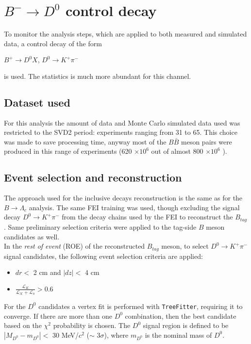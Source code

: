 
\section{$B^- \rightarrow D^0$ control decay}
\label{sec:chargedCorrBtoD0}

To monitor the analysis steps, which are applied to both measured and simulated data, a control decay of the form \\
\begin{center}
 $B^+ \rightarrow D^0 X$, $D^0 \rightarrow K^+ \pi^-$ 
\end{center}
is used. The statistics is much more abundant for this channel.

\subsection{Dataset used}

For this analysis the amount of data and Monte Carlo simulated data used was restricted to the SVD2 period: experiments ranging from 31 to 65. This choice was made to save processing time, anyway most of the $B\bar{B}$ meson pairs were produced in this range of experiments (620 $\times 10^6$ out of almost 800 $\times 10^6$ ).

\subsection{Event selection and reconstruction}

The approach used for the inclusive decays reconstruction is the same as for the $B \rightarrow \Lambda_c$ analysis. The same FEI training was used, though excluding the signal decay $D^0 \rightarrow K^+ \pi^-$ from the decay chains used by the FEI to reconstruct the $B_{tag}$.
Same preliminary selection criteria were applied to the tag-side $B$ meson candidates as well. \\
\noindent In the \textit{rest of event} (ROE) of the reconstructed $B_{tag}$ meson, to select $D^0 \rightarrow K^+ \pi^-$ signal candidates, the following event selection criteria are applied:
\begin{itemize}
\item $dr <$ 2 cm and $|dz| <$ 4 cm
\item $\frac{\mathcal{L}_{K}}{\mathcal{L_{K}}+\mathcal{L_{\pi}}} > 0.6$
\end{itemize}
For the $D^0 $ candidates a vertex fit is performed with \texttt{TreeFitter}, requiring it to converge.  If there are more than one $D^0$ combination, then the best candidate based on the $\chi^2$ probability is chosen. The $D^0$ signal region is defined to be $|M_{D^0}  - m_{D^0}| < $   30  MeV/$c^2$ 
\newline \noindent ($\sim$ 3$\sigma$), where $m_{D^0 }$ is the nominal mass of $D^0$.\\
